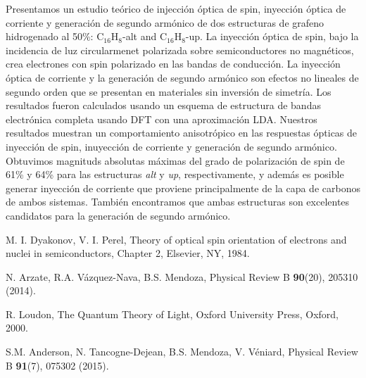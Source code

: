 \documentclass{./RiaoOptilas2016}
\begin{document}
Presentamos un estudio te\'orico de injecci\'on \'optica de spin, inyecci\'on
\'optica de corriente y generaci\'on de segundo arm\'onico de dos estructuras
de grafeno hidrogenado al 50\%: C$_{16}$H$_{8}$-alt and C$_{16}$H$_{8}$-up.
La inyección \'optica de spin, bajo la incidencia de luz circularmenet
polarizada sobre semiconductores no magn\'eticos, crea electrones con spin
polarizado en las bandas de conducci\'on\cite{dyakonovOO84}. La inyecci\'on
\'optica de corriente\cite{arzatePRB14} y la generaci\'on de segundo
arm\'onico \cite{loudonOUP00,andersonPRB15} son efectos no lineales de
segundo orden que se presentan en materiales sin inversi\'on de simetr\'ia.
Los resultados fueron calculados usando un esquema de estructura de bandas
electrónica completa usando DFT con una aproximaci\'on LDA. Nuestros
resultados muestran un comportamiento anisotr\'opico en las respuestas
\'opticas de inyecci\'on de spin, inuyecci\'on de corriente y generaci\'on de
segundo arm\'onico. Obtuvimos magnituds absolutas m\'aximas del grado de
polarizaci\'on de spin de 61\% y 64\% para las estructuras \emph{alt} y
\emph{up}, respectivamente, y adem\'as es posible generar inyecci\'on de
corriente que proviene principalmente de la capa de carbonos de ambos
sistemas. Tambi\'en encontramos que ambas estructuras son excelentes
candidatos para la generaci\'on de segundo arm\'onico.


\bigskip



\begin{thebibliography}{99}

 M. I. Dyakonov, V. I. Perel, Theory of optical spin
orientation of electrons and nuclei in semiconductors, Chapter 2, Elsevier,
NY, 1984.

 N. Arzate, R.A. V{\'a}zquez-Nava, B.S. Mendoza, Physical Review B \textbf{90}(20), 205310 (2014).

 R. Loudon, The Quantum Theory of Light, Oxford University Press, Oxford, 2000.

 S.M. Anderson, N. Tancogne-Dejean, B.S. Mendoza, V. V{\'e}niard, Physical Review B \textbf{91}(7), 075302 (2015).

\end{thebibliography}
\end{document}
